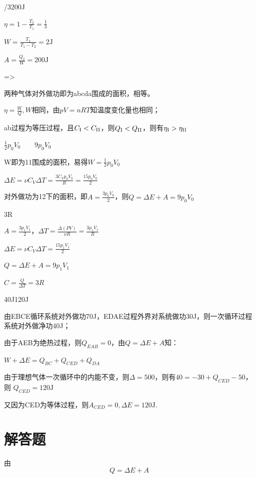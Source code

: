 /3\qquad200J

\solve
$\eta =1-\frac{T_2}{T_1}=\frac{1}{3}$

$W=\frac{T_2}{T_1-T_2}=2\mathrm{J}$

$A=\frac{Q_2}{W}=200\mathrm{J}$

\exercise =\qquad >

\solve 两种气体对外做功即为abcda围成的面积，相等。

$\eta=\frac{W}{Q},W$相同，由$pV=nRT$知温度变化量也相同；

ab过程为等压过程，且$C_{\text{\RNum{1}}}<C_\text{\RNum{2}}$，则$Q_{\text{\RNum{1}}}<Q_{\text{\RNum{2}}}$，则有$\eta_{\text{\RNum{1}}}>\eta_{\text{\RNum{2}}}$

\exercise $\frac{1}{2}p_0V_0\qquad 9p_0V_0$

\solve W即为1\to1围成的面积，易得$W=\frac{1}{2}p_0V_0$

$\Delta E=\nu C_V\Delta T=\frac{3C_Vp_0V_0}{R}=\frac{15p_0V_0}{2}$

对外做功为1\to2下的面积，即$A=\frac{3p_0V_0}{2}$，则$Q=\Delta E+A=9p_0V_0$

\exercise 3R

\solve
$A=\frac{3p_1V_1}{2}$，$\Delta T=\frac{\Delta(PV)}{\nu R}=\frac{3p_1V_1}{R}$

$\Delta E=\nu C_V\Delta T=\frac{15p_1V_1}{2}$

$Q=\Delta E+A=9p_1V_1$

\therefore$C=\frac{Q}{\Delta T}=3R$

\exercise 40J\qquad 120J

\solve 由EBCE循环系统对外做功70J，EDAE过程外界对系统做功30J，则一次循环过程系统对外做净功40J；

由于AEB为绝热过程，则$Q_{EAB}=0$，由$Q=\Delta E+A$知：

$W+\Delta E=Q_{BC}+Q_{CED}+Q_{DA}$

由于理想气体一次循环中的内能不变，则$\Delta=500$，则有$40=-30+Q_{CED}-50$，则
$Q_{CED}=120\mathrm{J}$

又因为CED为等体过程，则$A_{CED}=0,\Delta E=120\mathrm{J}$.

\section{解答题}

\exercise

\solve 由\[Q = \Delta E + A\]

